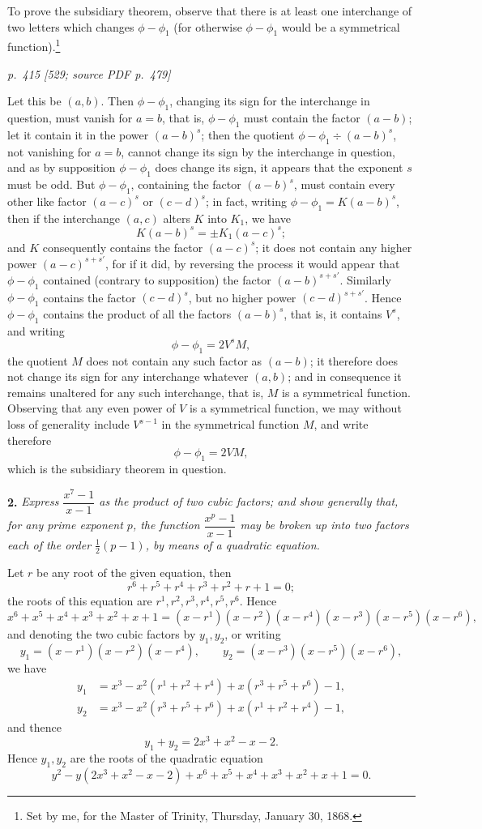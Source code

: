\documentclass[11pt,a4paper]{article}
\newcommand{\pagemarker}[3]{\par\bigskip\noindent\textit{p.~#1 [#2; source PDF p.~#3]}\par\smallskip}
\begin{document}
To prove the subsidiary theorem, observe that there is at least one interchange of two
letters which changes $\phi-\phi_1$ (for otherwise $\phi-\phi_1$ would be a symmetrical
function).\footnote{Set by me, for the Master of Trinity, Thursday, January 30, 1868.}

\pagemarker{415}{529}{479}

Let this be $(a,b)$. Then $\phi-\phi_1$, changing its sign for the interchange in
question, must vanish for $a=b$, that is, $\phi-\phi_1$ must contain the factor $(a-b)$;
let it contain it in the power $(a-b)^s$; then the quotient
$\phi-\phi_1\div(a-b)^s$, not vanishing for $a=b$, cannot change its sign by the
interchange in question, and as by supposition $\phi-\phi_1$ does change its sign, it
appears that the exponent $s$ must be odd. But $\phi-\phi_1$, containing the factor
$(a-b)^s$, must contain every other like factor $(a-c)^s$ or $(c-d)^s$; in fact,
writing $\phi-\phi_1=K(a-b)^s$, then if the interchange $(a,c)$ alters $K$ into $K_1$,
we have
\[
K(a-b)^s=\pm K_1(a-c)^s;
\]
and $K$ consequently contains the factor $(a-c)^s$; it does not contain any higher
power $(a-c)^{s+s'}$, for if it did, by reversing the process it would appear that
$\phi-\phi_1$ contained (contrary to supposition) the factor $(a-b)^{s+s'}$. Similarly
$\phi-\phi_1$ contains the factor $(c-d)^s$, but no higher power $(c-d)^{s+s'}$.
Hence $\phi-\phi_1$ contains the product of all the factors $(a-b)^s$, that is, it
contains $V^s$, and writing
\[
\phi-\phi_1=2V^sM,
\]
the quotient $M$ does not contain any such factor as $(a-b)$; it therefore does not
change its sign for any interchange whatever $(a,b)$; and in consequence it remains
unaltered for any such interchange, that is, $M$ is a symmetrical function. Observing
that any even power of $V$ is a symmetrical function, we may without loss of
generality include $V^{s-1}$ in the symmetrical function $M$, and write therefore
\[
\phi-\phi_1=2VM,
\]
which is the subsidiary theorem in question.

\textbf{2.} \textit{Express $\dfrac{x^7-1}{x-1}$ as the product of two cubic factors; and show
generally that, for any prime exponent $p$, the function $\dfrac{x^p-1}{x-1}$ may be
broken up into two factors each of the order $\frac12(p-1)$, by means of a quadratic
equation.}

Let $r$ be any root of the given equation, then
\[
r^6+r^5+r^4+r^3+r^2+r+1=0;
\]
the roots of this equation are $r^1,r^2,r^3,r^4,r^5,r^6$. Hence
\[
x^6+x^5+x^4+x^3+x^2+x+1
=(x-r^1)(x-r^2)(x-r^4)(x-r^3)(x-r^5)(x-r^6),
\]
and denoting the two cubic factors by $y_1,y_2$, or writing
\[
y_1=(x-r^1)(x-r^2)(x-r^4),\qquad
y_2=(x-r^3)(x-r^5)(x-r^6),
\]
we have
\[
\begin{aligned}
y_1&=x^3-x^2(r^1+r^2+r^4)+x(r^3+r^5+r^6)-1,\\
y_2&=x^3-x^2(r^3+r^5+r^6)+x(r^1+r^2+r^4)-1,
\end{aligned}
\]
and thence
\[
y_1+y_2=2x^3+x^2-x-2.
\]
Hence $y_1,y_2$ are the roots of the quadratic equation
\[
y^2-y(2x^3+x^2-x-2)+x^6+x^5+x^4+x^3+x^2+x+1=0.
\]
\end{document}

